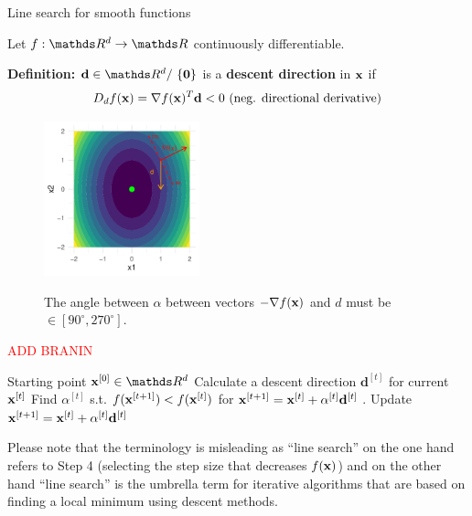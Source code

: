 \documentclass[11pt,compress,t,notes=noshow, xcolor=table]{beamer}
\begin{document}
\begin{vbframe}{Line search for smooth functions}

	Let $f: \R^d \to \R$ continuously differentiable.
	
	\lz
	
	\textbf{Definition:} $\mathbf{d}\in \R^d /\ \{\mathbf{0}\}$ is a \textbf{descent direction} in $\mathbf{x}$ if
	$$
	D_d f(\mathbf{x}) = \nabla f(\mathbf{x}) ^T \mathbf{d} < 0 \text{ (neg. directional derivative)}
	$$

	\begin{figure}
		\includegraphics[width = 0.4\textwidth]{figure_man/descent_direction.pdf} \\
		\begin{footnotesize}
			The angle between $\alpha$ between vectors $- \nabla f(\mathbf{x})$ and $d$ must be $\in [90^{\circ}, 270^{\circ}]$. 
		\end{footnotesize}
	\end{figure}

	\framebreak 

	\textcolor{red}{ADD BRANIN}

	\framebreak
	
	\begin{algorithm}[H]
	  \caption{Line search}
	  \begin{algorithmic}[1]
	  \State Starting point $\xv^{[0]} \in \R^d$
	    \State Calculate a descent direction $\mathbf{d}^{[t]}$ for current $\mathbf{x}^{[t]}$
	    \State Find $\alpha^{[t]}$ s.t. $f(\mathbf{x}^{[t + 1]}) < f(\mathbf{x}^{[t]})$ for $\mathbf{x}^{[t + 1]} = \mathbf{x}^{[t]} + \alpha^{[t]} \mathbf{d}^{[t]}$
	   .
	    \State Update $\mathbf{x}^{[t + 1]} = \mathbf{x}^{[t]} + \alpha^{[t]} \mathbf{d}^{[t]}$
	  \EndWhile
	  \end{algorithmic}
	\end{algorithm}
	\vspace*{-0.2cm}
	\begin{tiny}
		Please note that the terminology is misleading as ``line search'' on the one hand refers to Step 4 (selecting the step size that decreases $f(\mathbf{x})$) and on the other hand ``line search'' is the umbrella term for iterative algorithms that are based on finding a local minimum using descent methods. \par
	\end{tiny}


\end{vbframe}
\end{document}
